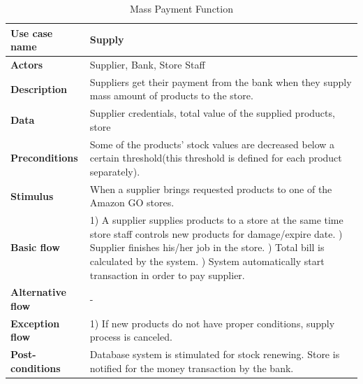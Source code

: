  \begin{table}[H]
     \centering
     \begin{tabular}{ | l | p{10cm} |}
     \hline
     \textbf{Use case name}    & Supply \\
     \hline
     \textbf{Actors}           & Supplier, Bank, Store Staff \\
     \hline
     \textbf{Description}      & Suppliers get their payment from the bank when they supply mass amount of products to the store. \\
     \hline
     \textbf{Data}             & Supplier credentials, total value of the supplied products, store \\
     \hline
     \textbf{Preconditions}    & Some of the products' stock values are decreased below a certain threshold(this threshold is defined for each product separately).  \\
     \hline
     \textbf{Stimulus}         & When a supplier brings requested products to one of the Amazon GO stores. \\
     \hline
     \textbf{Basic flow}       & 1) A supplier supplies products to a store at the same time store staff controls new products for damage/expire date. \newline 2) Supplier finishes his/her job in the store. \newline 3) Total bill is calculated by the system. \newline 4) System automatically start transaction in order to pay supplier. \\
     \hline
     \textbf{Alternative flow} & - \\
     \hline
     \textbf{Exception flow}   & 1) If new products do not have proper conditions, supply process is canceled. \\  
     \hline
     \textbf{Post-conditions}  & Database system is stimulated for stock renewing. \newline Store is notified for the money transaction by the bank. \\
     \hline
     \end{tabular} \caption{Mass Payment Function}
     \label{tab:07mass_payment}
 \end{table}

